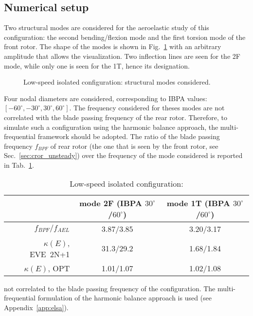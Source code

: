 
\subsection{Numerical setup}
\label{sub:dream_ls_ael_numerical}

Two structural modes are considered for the aeroelastic study of this 
configuration: the second bending/flexion mode and the first torsion mode
of the front rotor.
The shape of the modes is shown in Fig.~\ref{fig:dream_ls_ael_modes}
with an arbitrary amplitude that allows the visualization.
Two inflection lines are seen for the 2F mode, while only
one is seen for the 1T, hence its designation.
\begin{figure}[htp]
  \centering
  \caption{Low-speed isolated configuration: structural modes considered.}
  \label{fig:dream_ls_ael_modes}
\end{figure}

Four nodal diameters are considered, corresponding to IBPA
values: $[-60^\circ, -30^\circ, 30^\circ, 60^\circ]$. The frequency
considered for theses modes are not correlated with the blade
passing frequency of the rear rotor. Therefore, to simulate such
a configuration using the harmonic balance approach, the
multi-frequential framework should be adopted. The ratio of the
blade passing frequency $f_{BPF}$ of rear rotor (the one that is
seen by the front rotor, see Sec.~\ref{sec:cror_unsteady})
over the frequency of the mode considered is reported in
Tab.~\ref{tab:dream_ls_ael_freq_bpf}. 

\begin{table}[htp]
   \centering
  \begin{tabular}{r|cc}
    \toprule
    &  mode 2F (IBPA $30^\circ$/$60^\circ$) & mode 1T (IBPA $30^\circ$/$60^\circ$) \\
    \midrule
    $f_{BPF} / f_{AEL}$ & 3.87/3.85 & 3.20/3.17 \\ 
    $\kappa (E)$, EVE~2N+1 & 31.3/29.2 & 1.68/1.84 \\
    $\kappa (E)$, OPT & 1.01/1.07 & 1.02/1.08 \\
    \bottomrule
  \end{tabular}
  \caption{Low-speed isolated configuration:}
  \label{tab:dream_ls_ael_freq_bpf}
\end{table} 

not correlated to the blade
passing frequency of the configuration. The multi-frequential
formulation of the harmonic balance approach is used 
(see Appendix~\ref{app:elsa}). 